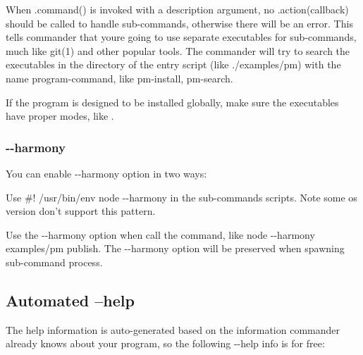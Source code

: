 When {\ttfamily .command()} is invoked with a description argument, no {\ttfamily .action(callback)} should be called to handle sub-\/commands, otherwise there will be an error. This tells commander that you\textquotesingle{}re going to use separate executables for sub-\/commands, much like {\ttfamily git(1)} and other popular tools. The commander will try to search the executables in the directory of the entry script (like {\ttfamily ./examples/pm}) with the name {\ttfamily program-\/command}, like {\ttfamily pm-\/install}, {\ttfamily pm-\/search}.

If the program is designed to be installed globally, make sure the executables have proper modes, like {}.

\subsubsection*{{\ttfamily -\/-\/harmony}}

You can enable {\ttfamily -\/-\/harmony} option in two ways\+:
\begin{DoxyItemize}
\item Use {\ttfamily \#! /usr/bin/env node -\/-\/harmony} in the sub-\/commands scripts. Note some os version don’t support this pattern.
\item Use the {\ttfamily -\/-\/harmony} option when call the command, like {\ttfamily node -\/-\/harmony examples/pm publish}. The {\ttfamily -\/-\/harmony} option will be preserved when spawning sub-\/command process.
\end{DoxyItemize}

\subsection*{Automated --help}

The help information is auto-\/generated based on the information commander already knows about your program, so the following {\ttfamily -\/-\/help} info is for free\+:




